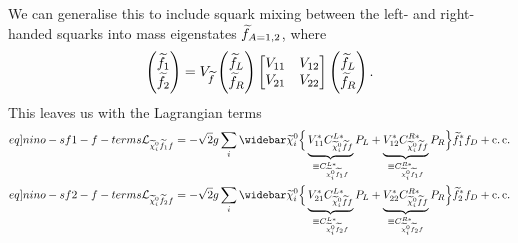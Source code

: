 \documentclass[english, notitlepage]{article}
\begin{document}
            We can generalise this to include squark mixing between the left- and right-handed squarks into mass eigenstates \(\widetilde{f}_{A=1,2}\), where
            \begin{align}
                \begin{pmatrix}
                    \widetilde{f}_1 \\
                    \widetilde{f}_2
                \end{pmatrix}
                =
                V_{\widetilde{f}} \begin{pmatrix}
                                   \widetilde{f}_L \\
                                   \widetilde{f}_R
                               \end{pmatrix}
                \begin{bmatrix}
                    V_{11} & V_{12} \\
                    V_{21} & V_{22}
                \end{bmatrix} \begin{pmatrix}
                                  \widetilde{f}_L \\
                                  \widetilde{f}_R
                              \end{pmatrix}.
            \end{align}
            This leaves us with the Lagrangian terms
            \begin{subequations}
                \begin{align}
                    \label[eq]{nino-sf1-f-terms}
                    \L_{\nino[i] \wtilde{f}_1 f} = -\sqrt{2} g \sum_{i} \wbar{\wtilde{\chi}}^0_i & \Big\{ \underbrace{V_{11}^\ast C_{\nino[i] \wtilde{f} f}^{L*}}_{\equiv C_{\nino[i] \wtilde{f}_1 f}^{L*}} P_L + \underbrace{V_{12}^\ast C_{\nino[i] \wtilde{f} f}^{R*}}_{\equiv C_{\nino[i] \wtilde{f}_1 f}^{R*}} P_R \Big\} \wtilde{f}_1^\ast f_D + \cc \\
                    \label[eq]{nino-sf2-f-terms}
                    \L_{\nino[i] \wtilde{f}_2 f} = -\sqrt{2} g \sum_{i} \wbar{\wtilde{\chi}}^0_i & \Big\{ \underbrace{V_{21}^\ast C_{\nino[i] \wtilde{f} f}^{L*}}_{\equiv C_{\nino[i] \wtilde{f}_2 f}^{L*}} P_L + \underbrace{V_{22}^\ast C_{\nino[i] \wtilde{f} f}^{R*}}_{\equiv C_{\nino[i] \wtilde{f}_2 f}^{R*}} P_R \Big\} \wtilde{f}_2^\ast f_D + \cc
                \end{align}
            \end{subequations}
\end{document}
